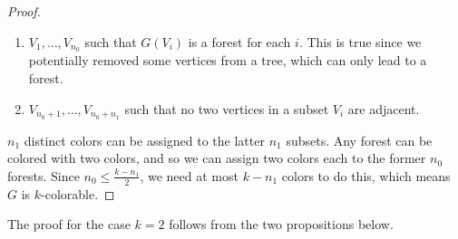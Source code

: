\documentclass[11pt]{article}
\begin{document}
\begin{proof}
\begin{enumerate}
\item $V_1, \ldots, V_{n_0}$ such that $G(V_i)$ is a forest for each $i$. This is true since we potentially removed some vertices from a tree, which can only lead to a forest.
\item $V_{n_0+1}, \ldots, V_{n_0+n_1}$ such that no two vertices in a subset $V_i$ are adjacent.
\end{enumerate}
$n_1$ distinct colors can be assigned to the latter $n_1$ subsets. Any forest can be colored with two colors, and so we can assign two colors each to the former $n_0$ forests. Since $n_0 \leq \frac{k-n_1}{2}$, we need at most $k-n_1$ colors to do this, which means $G$ is $k$-colorable. 
\end{proof}

The proof for the case $k=2$ follows from the two propositions below.
\end{document}
